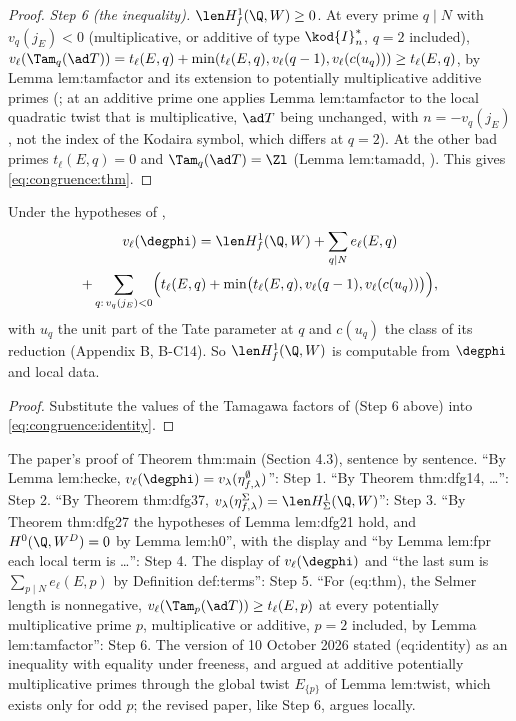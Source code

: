 \begin{proof}
\emph{Step 6 (the inequality).} $\len H^1_f(\Q,W)\ge0$. At every prime $q\mid N$ with $v_q(j_E)<0$ (multiplicative, or additive of type $\kod{I}_n^*$, $q=2$ included),
$v_\ell(\Tam_q(\ad T))=t_\ell(E,q)+\min(t_\ell(E,q),v_\ell(q-1),v_\ell(c(u_q)))\ge t_\ell(E,q)$, by Lemma lem:tamfactor and its extension to potentially multiplicative additive primes
(; at an additive prime one applies Lemma lem:tamfactor to the local quadratic twist that is multiplicative, $\ad T$ being unchanged, with $n=-v_q(j_E)$, not the
index of the Kodaira symbol, which differs at $q=2$). At the other bad primes $t_\ell(E,q)=0$ and $\Tam_q(\ad T)=\Zl$ (Lemma lem:tamadd, ). This gives \eqref{eq:congruence:thm}.
\end{proof}

\begin{corollary}\label{cor:congruence:explicit}
Under the hypotheses of ,
\begin{multline*}
v_\ell(\degphi)=\len H^1_f(\Q,W)+\sum_{q\mid N}e_\ell(E,q)\\
+\sum_{q:\,v_q(j_E)<0}\Bigl(t_\ell(E,q)+\min\bigl(t_\ell(E,q),v_\ell(q-1),v_\ell(c(u_q))\bigr)\Bigr),
\end{multline*}
with $u_q$ the unit part of the Tate parameter at $q$ and $c(u_q)$ the class of its reduction (Appendix B, B-C14). So $\len H^1_f(\Q,W)$ is computable from $\degphi$ and local data.
\end{corollary}

\begin{proof}
Substitute the values of the Tamagawa factors of  (Step 6 above) into \eqref{eq:congruence:identity}.
\end{proof}

\begin{paperlink}
The paper's proof of Theorem thm:main (Section 4.3), sentence by sentence. ``By Lemma lem:hecke, $v_\ell(\degphi)=v_\lambda(\eta^\emptyset_{f,\lambda})$'': Step 1. ``By Theorem thm:dfg14, \dots'': Step 2.
``By Theorem thm:dfg37, $v_\lambda(\eta^\Sigma_{f,\lambda})=\len H^1_\Sigma(\Q,W)$'': Step 3. ``By Theorem thm:dfg27 the hypotheses of Lemma lem:dfg21 hold, and $H^0(\Q,W^D)=0$ by Lemma lem:h0'', with
the display and ``by Lemma lem:fpr each local term is \dots'': Step 4. The display of $v_\ell(\degphi)$ and ``the last sum is $\sum_{p\mid N}e_\ell(E,p)$ by Definition def:terms'': Step 5. ``For
(eq:thm), the Selmer length is nonnegative, $v_\ell(\Tam_p(\ad T))\ge t_\ell(E,p)$ at every potentially multiplicative prime $p$, multiplicative or additive, $p=2$ included, by Lemma
lem:tamfactor'': Step 6. The version of 10 October 2026 stated (eq:identity) as an inequality with equality under freeness, and argued at additive potentially multiplicative primes
through the global twist $E_{\{p\}}$ of Lemma lem:twist, which exists only for odd $p$; the revised paper, like Step 6, argues locally.
\end{paperlink}

